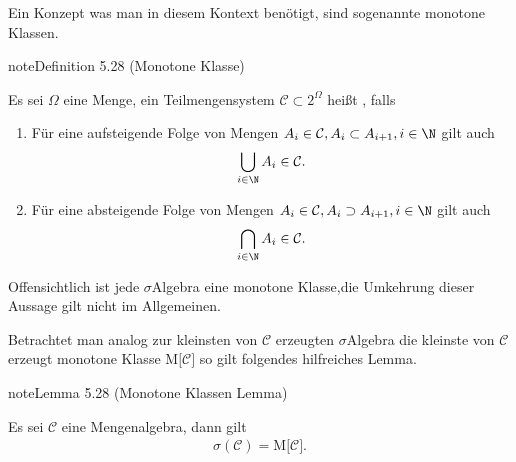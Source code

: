 \documentclass[letterpaper,10pt,german]{jupyterBook}
\begin{document}
\sphinxAtStartPar
Ein Konzept was man in diesem Kontext benötigt, sind sogenannte monotone Klassen.
\label{masstheorie/integrationstechnik:definition-13}
\begin{sphinxadmonition}{note}{Definition 5.28 (Monotone Klasse)}



\sphinxAtStartPar
Es sei \(\Omega\) eine Menge, ein Teilmengensystem \(\mathcal{C}\subset 2^\Omega\) heißt , falls
\begin{enumerate}
%
\item {} 
\sphinxAtStartPar
Für eine aufsteigende Folge von Mengen \(A_i\in\mathcal{C}, A_i\subset A_{i+1}, i\in\N\) gilt auch
\begin{equation*}
\begin{split}\bigcup_{i\in\N} A_i\in\mathcal{C}.\end{split}
\end{equation*}
\item {} 
\sphinxAtStartPar
Für eine absteigende Folge von Mengen \(A_i\in\mathcal{C}, A_i\supset A_{i+1}, i\in\N\) gilt auch
\begin{equation*}
\begin{split}\bigcap_{i\in\N} A_i\in\mathcal{C}.\end{split}
\end{equation*}
\end{enumerate}
\end{sphinxadmonition}

\sphinxAtStartPar
Offensichtlich ist jede \(\sigma\)\sphinxhyphen{}Algebra eine monotone Klasse,die Umkehrung dieser Aussage gilt nicht im Allgemeinen.

\sphinxAtStartPar
Betrachtet man analog zur kleinsten von \(\mathcal{C}\) erzeugten \(\sigma\)\sphinxhyphen{}Algebra die kleinste von \(\mathcal{C}\) erzeugt monotone Klasse \(\text{M}\big[\mathcal{C}\big]\) so gilt folgendes hilfreiches Lemma.
\label{masstheorie/integrationstechnik:lem:monclass}
\begin{sphinxadmonition}{note}{Lemma 5.28 (Monotone Klassen Lemma)}



\sphinxAtStartPar
Es sei \(\mathcal{C}\) eine Mengenalgebra, dann gilt
\begin{equation*}
\begin{split}\sigma(\mathcal{C}) = \text{M}\big[\mathcal{C}\big].\end{split}
\end{equation*}\end{sphinxadmonition}
\end{document}
